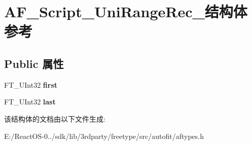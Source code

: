 \hypertarget{struct_a_f___script___uni_range_rec__}{}\section{A\+F\+\_\+\+Script\+\_\+\+Uni\+Range\+Rec\+\_\+结构体 参考}
\label{struct_a_f___script___uni_range_rec__}
\subsection*{Public 属性}
\begin{DoxyCompactItemize}
\item 
\mbox{\label{struct_a_f___script___uni_range_rec___aaadebc269ac972321ad0bdbf9936391e}} 
F\+T\+\_\+\+U\+Int32 {\bfseries first}
\item 
\mbox{\label{struct_a_f___script___uni_range_rec___af158de73747a194afb90eac02b4c65ad}} 
F\+T\+\_\+\+U\+Int32 {\bfseries last}
\end{DoxyCompactItemize}


该结构体的文档由以下文件生成\+:\begin{DoxyCompactItemize}
\item 
E\+:/\+React\+O\+S-\/0../sdk/lib/3rdparty/freetype/src/autofit/aftypes.\+h\end{DoxyCompactItemize}
